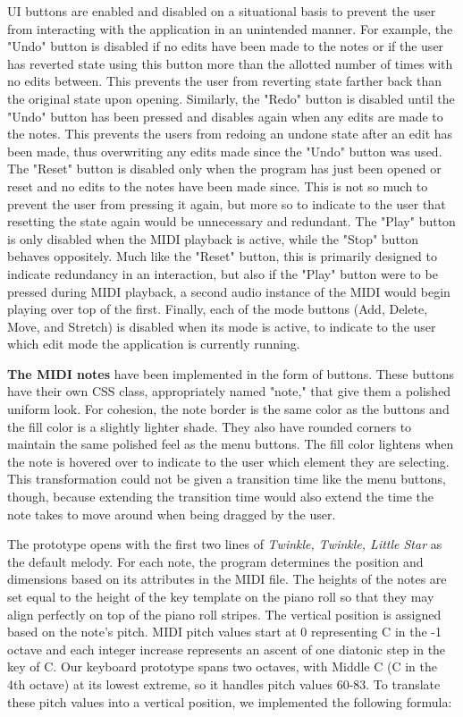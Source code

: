 UI buttons are enabled and disabled on a situational basis to prevent the user from interacting
with the application in an unintended manner. For example, the "Undo" button is disabled if no
edits have been made to the notes or if the user has reverted state using this button more than
the allotted number of times with no edits between. This prevents the user from reverting state
farther back than the original state upon opening. Similarly, the "Redo" button is disabled until
the "Undo" button has been pressed and disables again when any edits are made to the notes. This
prevents the users from redoing an undone state after an edit has been made, thus overwriting any
edits made since the "Undo" button was used. The "Reset" button is disabled only when the program
has just been opened or reset and no edits to the notes have been made since. This is not so much
to prevent the user from pressing it again, but more so to indicate to the user that resetting the
state again would be unnecessary and redundant. The "Play" button is only disabled when
the MIDI playback is active, while the "Stop" button behaves oppositely. Much like the "Reset"
button, this is primarily designed to indicate redundancy in an interaction, but also if the "Play"
button were to be pressed during MIDI playback, a second audio instance of the MIDI would begin
playing over top of the first. Finally, each of the mode buttons (Add, Delete, Move, and Stretch)
is disabled when its mode is active, to indicate to the user which edit mode the application is
currently running.

\textbf{The MIDI notes} have been implemented in the form of buttons. These buttons have their own CSS
class, appropriately named "note," that give them a polished uniform look. For cohesion, the note
border is the same color as the buttons and the fill color is a slightly lighter shade. They also
have rounded corners to maintain the same polished feel as the menu buttons. The fill color
lightens when the note is hovered over to indicate to the user which element they are selecting.
This transformation could not be given a transition time like the menu buttons, though, because
extending the transition time would also extend the time the note takes to move around when being
dragged by the user.

The prototype opens with the first two lines of \textit{Twinkle, Twinkle, Little Star} as the default
melody. For each note, the program determines the position and dimensions based on its attributes
in the MIDI file. The heights of the notes are set equal to the height of the key template on the
piano roll so that they may align perfectly on top of the piano roll stripes. The vertical position
is assigned based on the note's pitch. MIDI pitch values start at 0 representing C in the -1 octave
and each integer increase represents an ascent of one diatonic step in the key of C. Our keyboard
prototype spans two octaves, with Middle C (C in the 4th octave) at its lowest extreme, so it
handles pitch values 60-83. To translate these pitch values into a vertical position, we
implemented the following formula:

